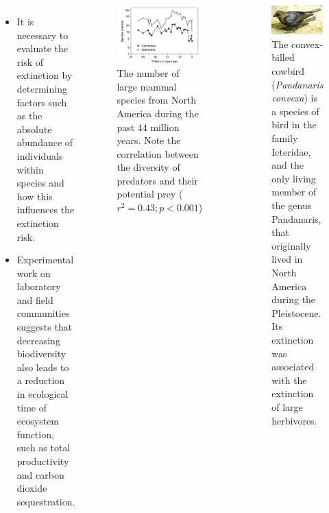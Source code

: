 \documentclass[
  ignorenonframetext,
  aspectratio=169]{beamer}
\providecommand{\tightlist}{%
  \setlength{\itemsep}{0pt}\setlength{\parskip}{0pt}}
\newcommand{\bcolumns}{\begin{columns}[T, onlytextwidth]}
\newcommand{\ecolumns}{\end{columns}}
\begin{document}
\begin{frame}{}
\protect\hypertarget{section-3}{}
\bcolumns
{}
\footnotesize

\begin{itemize}
\tightlist
\item
  It is necessary to evaluate the risk of extinction by determining
  factors such as the absolute abundance of individuals within species
  and how this influences the extinction risk.
\item
  Experimental work on laboratory and field communities suggests that
  decreasing biodiversity also leads to a reduction in ecological time
  of ecosystem function, such as total productivity and carbon dioxide
  sequestration.
\end{itemize}


\begin{figure}

{\centering \includegraphics[width=0.5\linewidth]{../images/diversity_of_predatory_prey_history} 

}

\caption{The number of large mammal species from North America during the past 44 million years. Note the correlation between the diversity of predators and their potential prey ($r^2 = 0.43; p < 0.001$)}\label{fig:predator-prey-history}
\end{figure}

\begin{figure}
\includegraphics[width=0.5\linewidth]{../images/cowbird} \caption{The convex-billed cowbird (\textit{Pandanaris convexa}) is a species of bird in the family Icteridae, and the only living member of the genus Pandanaris, that originally lived in North America during the Pleistocene. Its extinction was associated with the extinction of large herbivores.}\label{fig:pandanaris-cowbird}
\end{figure}

\ecolumns
\end{frame}
\end{document}
